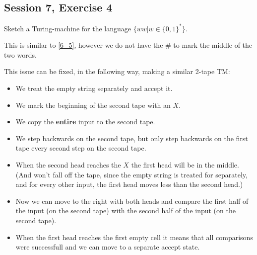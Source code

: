 \subsection {Session 7, Exercise 4}


Sketch a Turing-machine for the language $\{ww | w \in \{0,1\}^*\}$.


This is similar to \ref{6_5}, however we do not have the $\#$ to mark the middle of the two words.

This issue can be fixed, in the following way, making a similar 2-tape TM:

\begin{itemize}
    \item We treat the empty string separately and accept it.
    \item We mark the beginning of the second tape with an $X$.
    \item We copy the \textbf{entire} input to the second tape.
    \item We step backwards on the second tape, but only step backwards on the first tape every second step on the second tape.
    \item When the second head reaches the $X$ the first head will be in the middle. (And won't fall off the tape, since the empty string is treated for separately, and for every other input, the first head moves less than the second head.)
    \item Now we can move to the right with both heads and compare the first half of the input (on the second tape) with the second half of the input (on the second tape).
    \item When the first head reaches the first empty cell it means that all comparisons were successfull and we can move to a separate accept state.
\end{itemize}